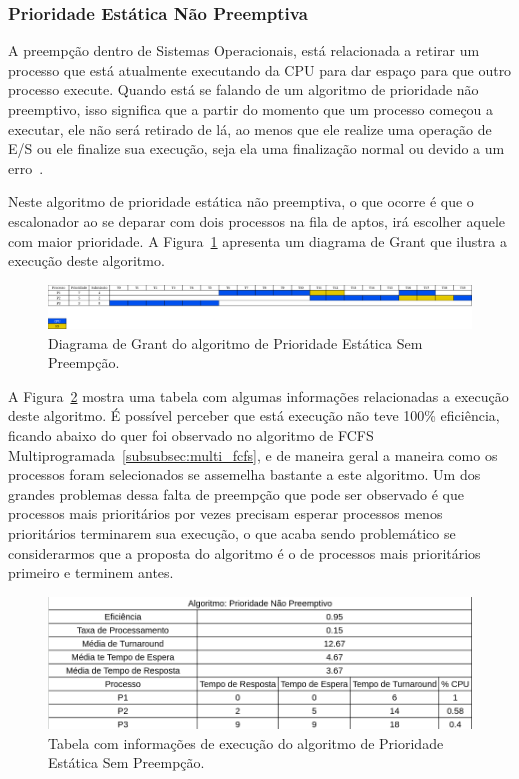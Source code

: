 \documentclass[
	12pt,				%
	oneside,   	        %
	a4paper,			%
	english,			%
	french,				%
	spanish,			%
	brazil,				%
	]{pacotes/abntex2}
\begin{document}
\subsubsection{Prioridade Estática Não Preemptiva}
\label{subsubsec:prio_sem_preemp}

A preempção dentro de Sistemas Operacionais, está relacionada a retirar um processo que está atualmente executando da CPU para dar espaço para que outro processo execute. Quando está se falando de um algoritmo de prioridade não preemptivo, isso significa que a partir do momento que um processo começou a executar, ele não será retirado de lá, ao menos que ele realize uma operação de E/S ou ele finalize sua execução, seja ela uma finalização normal ou devido a um erro~\cite{maziero2019}.

Neste algoritmo de prioridade estática não preemptiva, o que ocorre é que o escalonador ao se deparar com dois processos na fila de aptos, irá escolher aquele com maior prioridade. A Figura~\ref{fig:prio_sem_preemp} apresenta um diagrama de Grant que ilustra a execução deste algoritmo.

\begin{figure}[H]
  \centering
  \includegraphics[scale=0.20]{figuras/ex2/prio_sem_preemp.png}
  \caption{Diagrama de Grant do algoritmo de Prioridade Estática Sem Preempção.}
  \label{fig:prio_sem_preemp}
\end{figure}

A Figura~\ref{fig:table_prio_sem_preemp} mostra uma tabela com algumas informações relacionadas a execução deste algoritmo. É possível perceber que está execução não teve 100\% eficiência, ficando abaixo do quer foi observado no algoritmo de FCFS Multiprogramada~\ref{subsubsec:multi_fcfs}, e de maneira geral a maneira como os processos foram selecionados se assemelha bastante a este algoritmo. Um dos grandes problemas dessa falta de preempção que pode ser observado é que processos mais prioritários por vezes precisam esperar processos menos prioritários terminarem sua execução, o que acaba sendo problemático se considerarmos que a proposta do algoritmo é o de processos mais prioritários primeiro e terminem antes.

\begin{figure}[H]
  \centering
  \includegraphics[scale=0.5]{figuras/ex2/table_prio_sem_preemp.png}
  \caption{Tabela com informações de execução do algoritmo de Prioridade Estática Sem Preempção.}
  \label{fig:table_prio_sem_preemp}
\end{figure}
\end{document}
